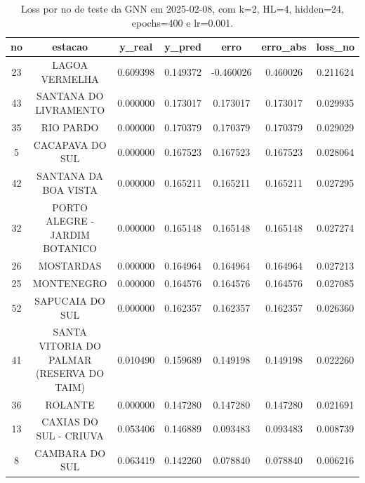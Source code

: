 \begin{table}[h]
\centering
\caption{Loss por no de teste da GNN em 2025-02-08, com k=2, HL=4, hidden=24, epochs=400 e lr=0.001.}
\label{tab:gnn_loss_k2_hl4_h24_e400_d20250208}
\begin{tabular}{ccccccc}
\toprule
no & estacao & y\_real & y\_pred & erro & erro\_abs & loss\_no \\
\midrule
23 & LAGOA VERMELHA & 0.609398 & 0.149372 & -0.460026 & 0.460026 & 0.211624 \\
43 & SANTANA DO LIVRAMENTO & 0.000000 & 0.173017 & 0.173017 & 0.173017 & 0.029935 \\
35 & RIO PARDO & 0.000000 & 0.170379 & 0.170379 & 0.170379 & 0.029029 \\
5 & CACAPAVA DO SUL & 0.000000 & 0.167523 & 0.167523 & 0.167523 & 0.028064 \\
42 & SANTANA DA BOA VISTA & 0.000000 & 0.165211 & 0.165211 & 0.165211 & 0.027295 \\
32 & PORTO ALEGRE - JARDIM BOTANICO & 0.000000 & 0.165148 & 0.165148 & 0.165148 & 0.027274 \\
26 & MOSTARDAS & 0.000000 & 0.164964 & 0.164964 & 0.164964 & 0.027213 \\
25 & MONTENEGRO & 0.000000 & 0.164576 & 0.164576 & 0.164576 & 0.027085 \\
52 & SAPUCAIA DO SUL & 0.000000 & 0.162357 & 0.162357 & 0.162357 & 0.026360 \\
41 & SANTA VITORIA DO PALMAR (RESERVA DO TAIM) & 0.010490 & 0.159689 & 0.149198 & 0.149198 & 0.022260 \\
36 & ROLANTE & 0.000000 & 0.147280 & 0.147280 & 0.147280 & 0.021691 \\
13 & CAXIAS DO SUL - CRIUVA & 0.053406 & 0.146889 & 0.093483 & 0.093483 & 0.008739 \\
8 & CAMBARA DO SUL & 0.063419 & 0.142260 & 0.078840 & 0.078840 & 0.006216 \\
\bottomrule
\end{tabular}
\end{table}
